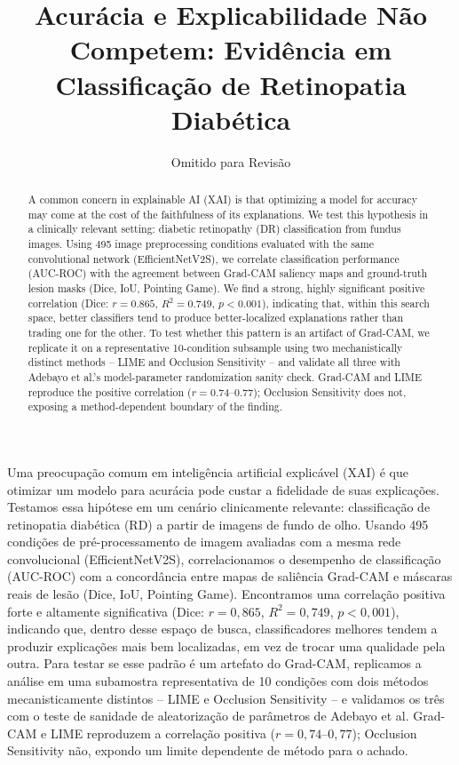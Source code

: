 \documentclass[12pt]{article}
\title{Acurácia e Explicabilidade Não Competem: Evidência em Classificação de Retinopatia Diabética}
\author{Omitido para Revisão\inst{1}}
\begin{document}
\maketitle

\begin{abstract}
A common concern in explainable AI (XAI) is that optimizing a model for
accuracy may come at the cost of the faithfulness of its explanations. We
test this hypothesis in a clinically relevant setting: diabetic retinopathy
(DR) classification from fundus images. Using 495 image preprocessing
conditions evaluated with the same convolutional network (EfficientNetV2S),
we correlate classification performance (AUC-ROC) with the agreement between
Grad-CAM saliency maps and ground-truth lesion masks (Dice, IoU, Pointing
Game). We find a strong, highly significant positive correlation (Dice:
$r=0.865$, $R^2=0.749$, $p<0.001$), indicating that, within this search
space, better classifiers tend to produce better-localized explanations
rather than trading one for the other. To test whether this pattern is an
artifact of Grad-CAM, we replicate it on a representative 10-condition
subsample using two mechanistically distinct methods -- LIME and Occlusion
Sensitivity -- and validate all three with Adebayo et al.'s model-parameter
randomization sanity check. Grad-CAM and LIME reproduce the positive
correlation ($r=0.74$--$0.77$); Occlusion Sensitivity does not, exposing a
method-dependent boundary of the finding.
\end{abstract}

\begin{resumo}
Uma preocupação comum em inteligência artificial explicável (XAI) é que
otimizar um modelo para acurácia pode custar a fidelidade de suas
explicações. Testamos essa hipótese em um cenário clinicamente relevante:
classificação de retinopatia diabética (RD) a partir de imagens de fundo de
olho. Usando 495 condições de pré-processamento de imagem avaliadas com a
mesma rede convolucional (EfficientNetV2S), correlacionamos o desempenho de
classificação (AUC-ROC) com a concordância entre mapas de saliência Grad-CAM
e máscaras reais de lesão (Dice, IoU, Pointing Game). Encontramos uma
correlação positiva forte e altamente significativa (Dice: $r=0,865$,
$R^2=0,749$, $p<0,001$), indicando que, dentro desse espaço de busca,
classificadores melhores tendem a produzir explicações mais bem localizadas,
em vez de trocar uma qualidade pela outra. Para testar se esse padrão é um
artefato do Grad-CAM, replicamos a análise em uma subamostra representativa
de 10 condições com dois métodos mecanisticamente distintos -- LIME e
Occlusion Sensitivity -- e validamos os três com o teste de sanidade de
aleatorização de parâmetros de Adebayo et al. Grad-CAM e LIME reproduzem a
correlação positiva ($r=0,74$--$0,77$); Occlusion Sensitivity não, expondo
um limite dependente de método para o achado.
\end{resumo}
\end{document}
